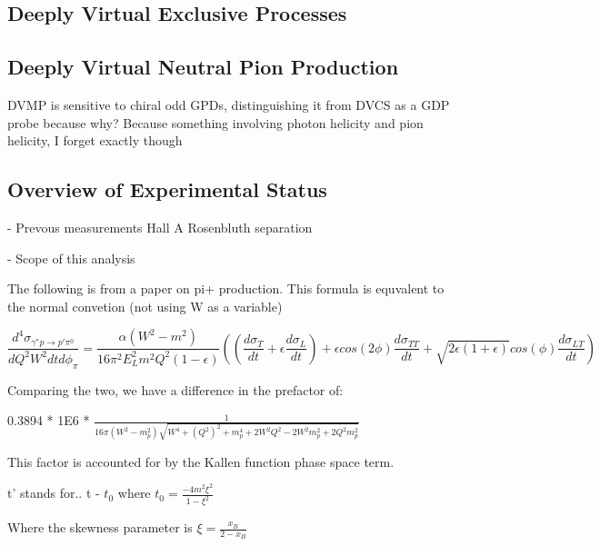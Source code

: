     \subsection{Deeply Virtual Exclusive Processes}

    \subsection{Deeply Virtual Neutral Pion Production}


 DVMP is sensitive to chiral odd GPDs, distinguishing it from DVCS as a GDP probe because why? Because something involving photon helicity and pion helicity, I forget exactly though


    \subsection{Overview of Experimental Status}
     - Prevous measurements
     Hall A Rosenbluth separation \cite{Defurne2016RosenbluthSection}

     
     - Scope of this analysis
    





\iffalse
        The following is from a paper on pi+ production. This formula is equvalent to the normal convetion (not using W as a variable)
        
         \begin{equation}\label{xsec}
             \frac{d^4\sigma_{\gamma^*p \rightarrow p'\pi^0}}{dQ^2W^2dtd\phi_{\pi}} =
             \frac{\alpha (W^2-m^2)}{16\pi^2 E^2_L m^2 Q^2 (1-\epsilon)}
             ((\frac{d\sigma_T}{dt}+\epsilon\frac{d\sigma_L}{dt})+
             \epsilon cos(2\phi) \frac{d\sigma_{TT}}{dt} + \sqrt{2\epsilon(1+\epsilon)}cos(\phi)\frac{d\sigma_{LT}}{dt})
        \end{equation}
        
        Comparing the two, we have a difference in the prefactor of:
        
        0.3894 * 1E6 * $\frac{1}{16\pi(W^2-m_p^2)\sqrt{W^4 + (Q^2)^2+m_p^4+2W^2Q^2-2W^2m_p^2+2Q^2m_p^2}}$
        
        This factor is accounted for by the Kallen function phase space term.
        
        
        
        
        t' stands for.. t - $t_0$ where $t_0 = \frac{-4m^2\xi^2}{1-\xi^2}$
        
           Where the skewness parameter is $\xi = \frac{x_B}{2-x_B}$ 
           
